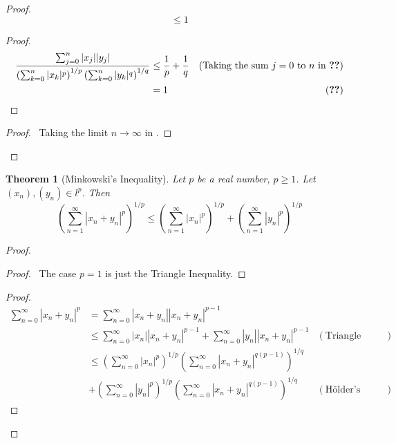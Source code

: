 \documentclass{book}
\let\qed\relax
\newtheorem{thm}[ax]{Theorem}
\theoremstyle{definition}
\begin{document}
\begin{proof}
{\[\leq 1 \]}
\begin{proof}
	\pf
	\begin{align*}
	\frac{\sum_{j=0}^n |x_j||y_j|}{\left( \sum_{k=0}^n |x_k|^p \right)^{1/p} \left( \sum_{k=0}^n |y_k|^q \right)^{1/q}}
	& \leq \frac{1}{p} + \frac{1}{q} & (\text{Taking the sum $j = 0$ to $n$ in \stepref{8}}) \\
	& = 1 & (\text{\stepref{2}})
	\end{align*}
\end{proof}
\qedstep
\begin{proof}
	\pf\ Taking the limit $n \rightarrow \infty$ in .
\end{proof}
\qed
\end{proof}

\begin{thm}[Minkowski's Inequality]
Let $p$ be a real number, $p \geq 1$. Let $(x_n), (y_n) \in l^p$. Then
\[ \left( \sum_{n=1}^\infty |x_n + y_n|^p \right)^{1/p} \leq \left( \sum_{n=1}^\infty |x_n|^p \right)^{1/p} + \left( \sum_{n=1}^\infty |y_n|^p \right)^{1/p} \]
\end{thm}

\begin{proof}
\pf
{}
\begin{proof}
	\pf\ The case $p=1$ is just the Triangle Inequality.
\end{proof}
\begin{proof}
	\pf
	\begin{align*}
		\sum_{n=0}^\infty |x_n + y_n|^p
		& = \sum_{n=0}^\infty |x_n + y_n| |x_n + y_n|^{p-1} \\
		& \leq \sum_{n=0}^\infty |x_n| |x_n + y_n|^{p-1} + 
		\sum_{n=0}^\infty |y_n| |x_n + y_n|^{p-1} & (\text{Triangle Inequality}) \\
		& \leq \left( \sum_{n=0}^\infty |x_n|^p \right)^{1/p} \left( \sum_{n=0}^\infty |x_n + y_n|^{q(p-1)} \right)^{1/q} \\
		& + \left( \sum_{n=0}^\infty |y_n|^p \right)^{1/p} \left( \sum_{n=0}^\infty |x_n + y_n|^{q(p-1)} \right)^{1/q} & (\text{H\"{o}lder's Inequality})
	\end{align*}
\end{proof}
\qedstep
\qed
\end{proof}
\end{document}

